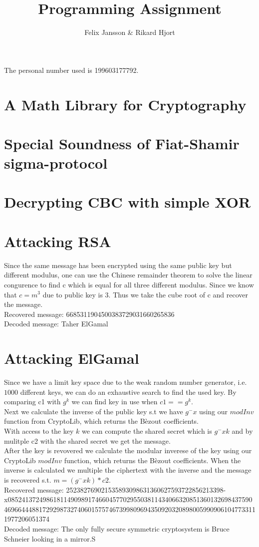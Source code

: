 \documentclass{article}
\author{Felix Jansson \& Rikard Hjort}
\title{Programming Assignment}
\begin{document}
The personal number used is 199603177792.

\section{A Math Library for Cryptography}

\section{Special Soundness of Fiat-Shamir sigma-protocol}

\section{Decrypting CBC with simple XOR}


\section{Attacking RSA}
Since the same message has been encrypted using the same public key but different modulus, one can use the Chinese remainder theorem to solve the linear congurence to find c which is equal for all three different modulus. Since we know that $c=m^3$ due to public key is 3. Thus we take the cube root of c and recover the message.\\

Recovered message: 6685311904500383729031660265836\\
Decoded message: Taher ElGamal
       
\section{Attacking ElGamal}
Since we have a limit key space due to the weak random number generator, i.e. $1000$ different keys,  we can do an exhaustive search to find the used key. By comparing c1 with $g^k$ we can find key in use when $c1==g^k$.\\

Next we calculate the inverse of the public key s.t we have $g^-x$ using our $modInv$ function from CryptoLib, which returns the Bèzout coefficients.\\

With access to the key $k$ we can compute the shared secret which is $g^-xk$ and by mulitple c2 with the shared secret we get the message.\\

After the key is revovered we calculate the modular inverese of the key using our CryptoLib $modInv$ function, which returns the Bèzout coefficients. When the inverse is calculated we multiple the ciphertext with the inverse and the message is recovered s.t. $m = (g^-xk)* c2$. \\

Recovered message: 252382769021535893098631360627593722856213398-x08524137249861811490989174660457702955038114340663208513601326984375904696644488172929873274060157574673998096943509203208980059909061047733111977206051374 \\
Decoded message: The only fully secure symmetric cryptosystem is Bruce Schneier looking in a mirror.S       \\
\end{document}
